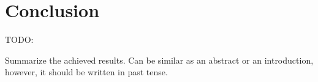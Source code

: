 
\chapter{Conclusion\label{chap:conclusion}}

TODO:

Summarize the achieved results.
Can be similar as an abstract or an introduction, however, it should be written in past tense.
